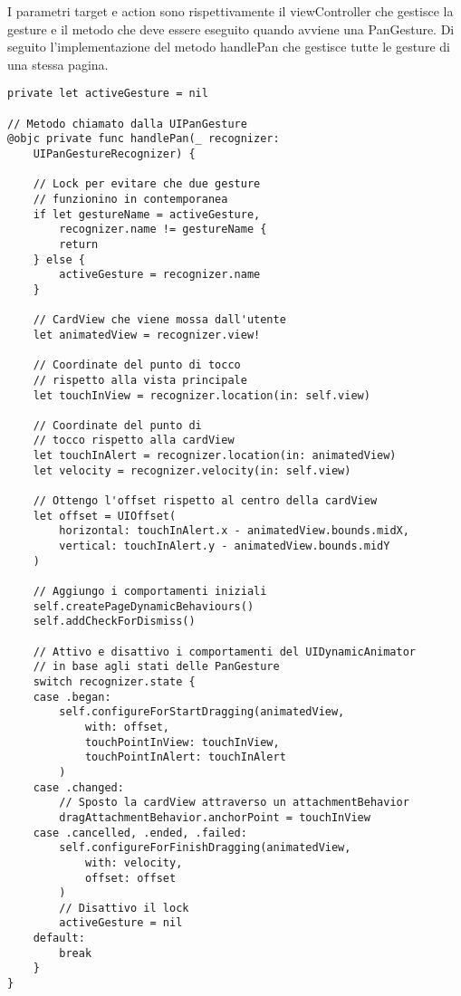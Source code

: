 I parametri target e action sono rispettivamente il viewController che gestisce la gesture e il metodo
che deve essere eseguito quando avviene una PanGesture.
Di seguito l'implementazione del metodo handlePan che gestisce tutte le gesture di una stessa pagina.

\begin{verbatim}
private let activeGesture = nil

// Metodo chiamato dalla UIPanGesture
@objc private func handlePan(_ recognizer:
    UIPanGestureRecognizer) {

    // Lock per evitare che due gesture
    // funzionino in contemporanea
    if let gestureName = activeGesture,
        recognizer.name != gestureName {
        return
    } else {
        activeGesture = recognizer.name
    }
    
    // CardView che viene mossa dall'utente
    let animatedView = recognizer.view!
    
    // Coordinate del punto di tocco
    // rispetto alla vista principale
    let touchInView = recognizer.location(in: self.view)

    // Coordinate del punto di
    // tocco rispetto alla cardView
    let touchInAlert = recognizer.location(in: animatedView)
    let velocity = recognizer.velocity(in: self.view)
    
    // Ottengo l'offset rispetto al centro della cardView
    let offset = UIOffset(
        horizontal: touchInAlert.x - animatedView.bounds.midX,
        vertical: touchInAlert.y - animatedView.bounds.midY
    )

    // Aggiungo i comportamenti iniziali
    self.createPageDynamicBehaviours()
    self.addCheckForDismiss()
    
    // Attivo e disattivo i comportamenti del UIDynamicAnimator
    // in base agli stati delle PanGesture
    switch recognizer.state {
    case .began:
        self.configureForStartDragging(animatedView,
            with: offset,
            touchPointInView: touchInView,
            touchPointInAlert: touchInAlert
        )
    case .changed:
        // Sposto la cardView attraverso un attachmentBehavior
        dragAttachmentBehavior.anchorPoint = touchInView
    case .cancelled, .ended, .failed:
        self.configureForFinishDragging(animatedView,
            with: velocity,
            offset: offset
        )
        // Disattivo il lock
        activeGesture = nil
    default:
        break
    }
}
\end{verbatim}


